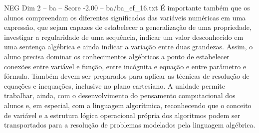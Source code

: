 \begin{textsample}{NEG Dim 2 – ba – Score -2.00 – ba/ba\_ef\_16.txt}
É importante também que os alunos compreendam os diferentes significados das variáveis numéricas em uma expressão, que sejam capazes de estabelecer a generalização de uma propriedade, investigar a regularidade de uma sequência, indicar um valor desconhecido em uma sentença algébrica e ainda indicar a variação entre duas grandezas.
Assim, o aluno precisa dominar os conhecimentos algébricos a ponto de estabelecer conexões entre variável e função, entre incógnita e equação e entre parâmetro e fórmula.
Também devem ser preparados para aplicar as técnicas de resolução de equações e inequações, inclusive no plano cartesiano.
A unidade permite trabalhar, ainda, com o desenvolvimento do pensamento computacional dos alunos e, em especial, com a linguagem algorítmica, reconhecendo que o conceito de variável e a estrutura lógica operacional própria dos algoritmos podem ser transportados para a resolução de problemas modelados pela linguagem algébrica.

\end{textsample}
